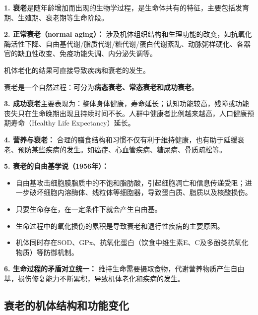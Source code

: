 \begin{defbox}
\textbf{1. 衰老}是随年龄增加而出现的生物学过程，是生命体共有的特征，主要包括发育期、生殖期、衰老期等生命阶段。

\textbf{2. 正常衰老（normal aging）：}
涉及机体组织结构和生理功能的改变，如抗氧化酶活性下降、自由基代谢/脂质代谢/糖代谢/蛋白代谢紊乱、动脉粥样硬化、各器官的缺血性改变、免疫功能失调、内分泌失调等。

机体老化的结果可直接导致疾病和衰老的发生。

衰老是一个自然过程：可分为\textbf{病态衰老、常态衰老和成功衰老}。

\textbf{3. 成功衰老}主要表现为：整体身体健康，寿命延长；认知功能较高，残障或功能丧失只在生命晚期出现且持续时间不长。人群中健康者比例越来越高，人口健康预期寿命（Healthy Life Expectancy）延长。

\textbf{4. 营养与衰老：}
合理的膳食结构和习惯不仅有利于维持健康，也有助于延缓衰老、预防某些疾病的发生。如癌症、心血管疾病、糖尿病、骨质疏松等。

\textbf{5. 衰老的自由基学说（1956年）：}
\begin{itemize}[leftmargin=*]
    \item 自由基攻击细胞膜脂质中的不饱和脂肪酸，引起细胞凋亡和信息传递受阻；进一步破坏细胞内溶酶体、线粒体等细胞器，导致蛋白质、脂质以及核酸损伤。
    \item 只要生命存在，在一定条件下就会产生自由基。
    \item 生命过程中的氧化损伤的累积是导致衰老和退行性疾病的主要原因。
    \item 机体同时存在SOD、GPx、抗氧化蛋白（饮食中维生素E、C及多酚类抗氧化物质）等防御机制。
\end{itemize}

\textbf{6. 生命过程的矛盾对立统一：}
维持生命需要摄取食物，代谢营养物质产生自由基，损伤修复能力不断累积，导致机体老化和疾病的发生。
\end{defbox}

\subsection{衰老的机体结构和功能变化}

